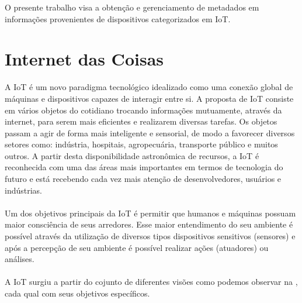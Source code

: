O presente trabalho visa a obtenção e gerenciamento de metadados em informações provenientes de
dispositivos categorizados em \acrfull{IoT}. %


\section{Internet das Coisas}%
A \acrlong{IoT} é um novo paradigma tecnológico idealizado como uma conexão global
de máquinas e dispositivos capazes de interagir entre si. A proposta de \acrshort{IoT} consiste em vários objetos do cotidiano trocando informações
mutuamente, através da internet, para serem mais eficientes e realizarem diversas tarefas.
Os objetos passam a agir de forma mais inteligente e sensorial, de modo a favorecer diversos setores como:
indústria, hospitais, agropecuária, transporte público e muitos outros. A partir desta
disponibilidade astronômica de recursos, a \acrshort{IoT} é reconhecida com uma das áreas mais importantes
em termos de tecnologia do futuro e está recebendo cada vez mais atenção de desenvolvedores, usuários e indústrias.
\\\\Um dos objetivos principais da \acrlong{IoT} é permitir
que humanos e máquinas possuam maior consciência de seus arredores.
 Esse maior entendimento do seu ambiente é possível através da utilização
 de diversos tipos dispositivos sensitivos (sensores) e após a percepção
 de seu ambiente é possível realizar ações (atuadores) ou análises.\\\\
 A \acrlong{IoT} surgiu a partir do cojunto de diferentes visões como podemos observar na , cada qual com seus objetivos específicos.
